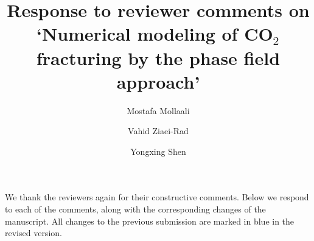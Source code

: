 \documentclass{elsarticle}
\begin{document}
\begin{frontmatter}



\title{Response to reviewer comments on `Numerical modeling of CO$_2$ fracturing by the phase field approach'}


\author[mymainaddress]{Mostafa Mollaali}

\author[mysecondaryaddress]{Vahid Ziaei-Rad}

\author[mymainaddress]{Yongxing Shen}

\address[mymainaddress]{University of Michigan -- Shanghai Jiao Tong University Joint Institute, Shanghai Jiao Tong University,	Shanghai, 200240, China}
\address[mysecondaryaddress]{Department of Civil Engineering, Isfahan University of Technology, Isfahan 84156-83111, Iran}
\end{frontmatter}


We thank the reviewers again for their constructive comments. Below we respond to each of the comments, along with the corresponding changes of the manuscript. All changes to the previous submission are marked {\color{blue} in blue} in the revised version.


\end{document}
